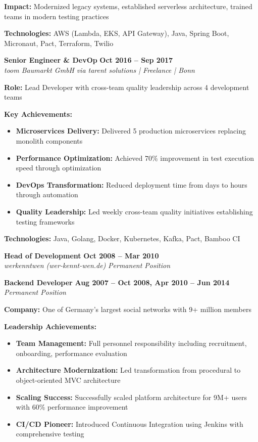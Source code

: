 \documentclass[11pt,a4paper]{article}
\newcommand{\jobheader}[4]{%
    \textbf{\large #1} \hfill \textbf{#2} \\
    \textit{#3} \hfill \textit{#4}
}
\begin{document}
\textbf{Impact:} Modernized legacy systems, established serverless architecture, trained teams in modern testing practices

\textbf{Technologies:} AWS (Lambda, EKS, API Gateway), Java, Spring Boot, Micronaut, Pact, Terraform, Twilio

\vspace{1em}

\jobheader{Senior Engineer \& DevOp}{Oct 2016 -- Sep 2017}{toom Baumarkt GmbH}{via tarent solutions | Freelance | Bonn}

\textbf{Role:} Lead Developer with cross-team quality leadership across 4 development teams

\textbf{Key Achievements:}
\begin{itemize}[leftmargin=*,noitemsep,topsep=0pt]
\item \textbf{Microservices Delivery:} Delivered 5 production microservices replacing monolith components
\item \textbf{Performance Optimization:} Achieved 70\% improvement in test execution speed through optimization
\item \textbf{DevOps Transformation:} Reduced deployment time from days to hours through automation
\item \textbf{Quality Leadership:} Led weekly cross-team quality initiatives establishing testing frameworks
\end{itemize}

\textbf{Technologies:} Java, Golang, Docker, Kubernetes, Kafka, Pact, Bamboo CI

\vspace{1em}

\jobheader{Head of Development}{Oct 2008 -- Mar 2010}{werkenntwen (wer-kennt-wen.de)}{Permanent Position}
\jobheader{Backend Developer}{Aug 2007 -- Oct 2008, Apr 2010 -- Jun 2014}{}{Permanent Position}

\textbf{Company:} One of Germany's largest social networks with 9+ million members

\textbf{Leadership Achievements:}
\begin{itemize}[leftmargin=*,noitemsep,topsep=0pt]
\item \textbf{Team Management:} Full personnel responsibility including recruitment, onboarding, performance evaluation
\item \textbf{Architecture Modernization:} Led transformation from procedural to object-oriented MVC architecture
\item \textbf{Scaling Success:} Successfully scaled platform architecture for 9M+ users with 60\% performance improvement
\item \textbf{CI/CD Pioneer:} Introduced Continuous Integration using Jenkins with comprehensive testing
\end{itemize}
\end{document}

